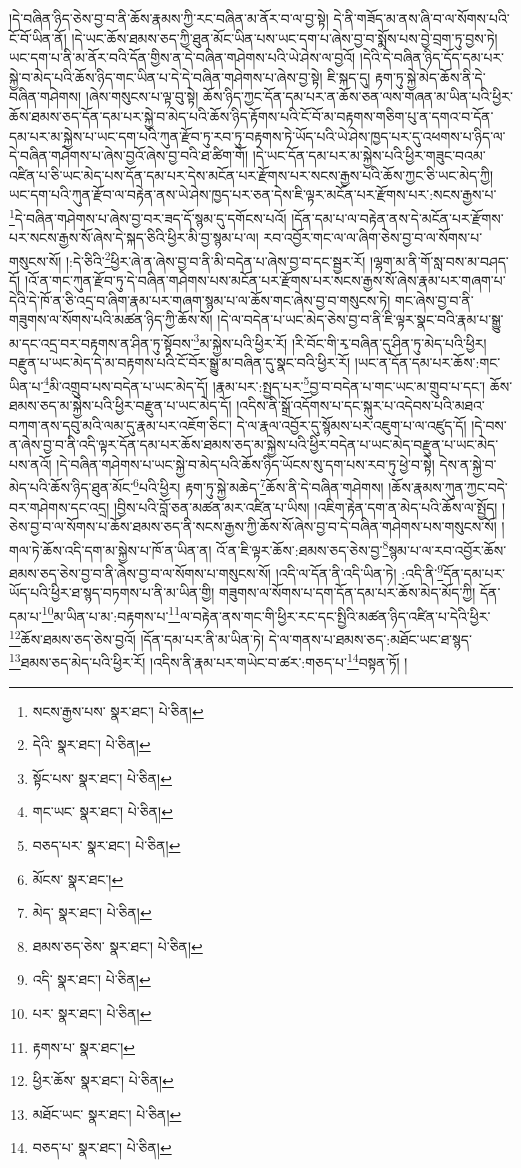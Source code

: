 །དེ་བཞིན་ཉིད་ཅེས་བྱ་བ་ནི་ཆོས་རྣམས་ཀྱི་རང་བཞིན་མ་ནོར་བ་ལ་བྱ་སྟེ། དེ་ནི་གཟོད་མ་ནས་ཞི་བ་ལ་སོགས་པའི་ངོ་བོ་ཡིན་ནོ། །དེ་ཡང་ཆོས་ཐམས་ཅད་ཀྱི་ཐུན་མོང་ཡིན་པས་ཡང་དག་པ་ཞེས་བྱ་བ་སྨོས་པས་བྱེ་བྲག་ཏུ་བྱས་ཏེ། ཡང་དག་པ་ནི་མ་ནོར་བའི་དོན་གྱིས་ན་དེ་བཞིན་གཤེགས་པའི་ཡེ་ཤེས་ལ་བྱའོ། །དེའི་དེ་བཞིན་ཉིད་དོད་དམ་པར་སྐྱེ་བ་མེད་པའི་ཆོས་ཉིད་གང་ཡིན་པ་དེ་དེ་བཞིན་གཤེགས་པ་ཞེས་བྱ་སྟེ། ཇི་སྐད་དུ། རྟག་ཏུ་སྐྱེ་མེད་ཆོས་ནི་དེ་བཞིན་གཤེགས། །ཞེས་གསུངས་པ་ལྟ་བུ་སྟེ། ཆོས་ཉིད་ཀྱང་དོན་དམ་པར་ན་ཆོས་ཅན་ལས་གཞན་མ་ཡིན་པའི་ཕྱིར་ཆོས་ཐམས་ཅད་དོན་དམ་པར་སྐྱེ་བ་མེད་པའི་ཆོས་ཉིད་རྟོགས་པའི་ངོ་བོ་མ་བརྟགས་གཅིག་པུ་ན་དགའ་བ་དོན་དམ་པར་མ་སྐྱེས་པ་ཡང་དག་པའི་ཀུན་རྫོབ་ཏུ་རབ་ཏུ་བརྟགས་ཏེ་ཡོད་པའི་ཡེ་ཤེས་ཁྱད་པར་དུ་འཕགས་པ་ཉིད་ལ་དེ་བཞིན་གཤེགས་པ་ཞེས་བྱའོ་ཞེས་བྱ་བའི་ཐ་ཚིག་གོ། །དེ་ཡང་དོན་དམ་པར་མ་སྐྱེས་པའི་ཕྱིར་གཟུང་བའམ་འཛིན་པ་ཅི་ཡང་མེད་པས་དོན་དམ་པར་དེས་མངོན་པར་རྫོགས་པར་སངས་རྒྱས་པའི་ཆོས་ཀྱང་ཅི་ཡང་མེད་ཀྱི། ཡང་དག་པའི་ཀུན་རྫོབ་ལ་བརྟེན་ནས་ཡེ་ཤེས་ཁྱད་པར་ཅན་དེས་ཇི་ལྟར་མངོན་པར་རྫོགས་པར་:སངས་རྒྱས་པ་\footnote{སངས་རྒྱས་པས་  སྣར་ཐང་།  པེ་ཅིན། }དེ་བཞིན་གཤེགས་པ་ཞེས་བྱ་བར་ཟད་དོ་སྙམ་དུ་དགོངས་པའོ། །དོན་དམ་པ་ལ་བརྟེན་ནས་དེ་མངོན་པར་རྫོགས་པར་སངས་རྒྱས་སོ་ཞེས་དེ་སྐད་ཅིའི་ཕྱིར་མི་བྱ་སྙམ་པ་ལ། རབ་འབྱོར་གང་ལ་ལ་ཞིག་ཅེས་བྱ་བ་ལ་སོགས་པ་གསུངས་སོ། །:དེ་ཅིའི་\footnote{དེའི་  སྣར་ཐང་།  པེ་ཅིན། }ཕྱིར་ཞེ་ན་ཞེས་བྱ་བ་ནི་མི་བདེན་པ་ཞེས་བྱ་བ་དང་སྦྱར་རོ། །ལྷག་མ་ནི་གོ་སླ་བས་མ་བཤད་དོ། །འོ་ན་གང་ཀུན་རྫོབ་ཏུ་དེ་བཞིན་གཤེགས་པས་མངོན་པར་རྫོགས་པར་སངས་རྒྱས་སོ་ཞེས་རྣམ་པར་གཞག་པ་དེའི་དེ་ཁོ་ན་ཅི་འདྲ་བ་ཞིག་རྣམ་པར་གཞག་སྙམ་པ་ལ་ཆོས་གང་ཞེས་བྱ་བ་གསུངས་ཏེ། གང་ཞེས་བྱ་བ་ནི་གཟུགས་ལ་སོགས་པའི་མཚན་ཉིད་ཀྱི་ཆོས་སོ། །དེ་ལ་བདེན་པ་ཡང་མེད་ཅེས་བྱ་བ་ནི་ཇི་ལྟར་སྣང་བའི་རྣམ་པ་སྒྱུ་མ་དང་འདྲ་བར་བརྟགས་ན་ཤིན་ཏུ་སྟོབས་\footnote{སྟོང་པས་  སྣར་ཐང་།  པེ་ཅིན། }མ་སྐྱེས་པའི་ཕྱིར་རོ། །རི་བོང་གི་རྭ་བཞིན་དུ་ཤིན་ཏུ་མེད་པའི་ཕྱིར། བརྫུན་པ་ཡང་མེད་དེ་མ་བརྟགས་པའི་ངོ་བོར་སྒྱུ་མ་བཞིན་དུ་སྣང་བའི་ཕྱིར་རོ། །ཡང་ན་དོན་དམ་པར་ཆོས་:གང་ཡིན་པ་\footnote{གང་ཡང་  སྣར་ཐང་།  པེ་ཅིན། }མི་འགྲུབ་པས་བདེན་པ་ཡང་མེད་དོ། །རྣམ་པར་:སྤྱད་པར་\footnote{བཅད་པར་  སྣར་ཐང་།  པེ་ཅིན། }བྱ་བ་བདེན་པ་གང་ཡང་མ་གྲུབ་པ་དང་། ཆོས་ཐམས་ཅད་མ་སྐྱེས་པའི་ཕྱིར་བརྫུན་པ་ཡང་མེད་དོ། །འདིས་ནི་སྒྲོ་འདོགས་པ་དང་སྐུར་པ་འདེབས་པའི་མཐའ་བཀག་ནས་དབུ་མའི་ལམ་དུ་རྣམ་པར་འཇོག་ཅིང་། དེ་ལ་རྣལ་འབྱོར་དུ་སྙོམས་པར་འཇུག་པ་ལ་འཛུད་དོ། །དེ་བས་ན་ཞེས་བྱ་བ་ནི་འདི་ལྟར་དོན་དམ་པར་ཆོས་ཐམས་ཅད་མ་སྐྱེས་པའི་ཕྱིར་བདེན་པ་ཡང་མེད་བརྫུན་པ་ཡང་མེད་པས་ནའོ། །དེ་བཞིན་གཤེགས་པ་ཡང་སྐྱེ་བ་མེད་པའི་ཆོས་ཉིད་ཡོངས་སུ་དག་པས་རབ་ཏུ་ཕྱེ་བ་སྟེ། དེས་ན་སྐྱེ་བ་མེད་པའི་ཆོས་ཉིད་ཐུན་མོང་\footnote{མོངས་  སྣར་ཐང་། }པའི་ཕྱིར། རྟག་ཏུ་སྐྱེ་མཆེད་\footnote{མེད་  སྣར་ཐང་།  པེ་ཅིན། }ཆོས་ནི་དེ་བཞིན་གཤེགས། །ཆོས་རྣམས་ཀུན་ཀྱང་བདེ་བར་གཤེགས་དང་འདྲ། །བྱིས་པའི་བློ་ཅན་མཚན་མར་འཛིན་པ་ཡིས། །འཇིག་རྟེན་དག་ན་མེད་པའི་ཆོས་ལ་སྤྱོད། །ཅེས་བྱ་བ་ལ་སོགས་པ་ཆོས་ཐམས་ཅད་ནི་སངས་རྒྱས་ཀྱི་ཆོས་སོ་ཞེས་བྱ་བ་དེ་བཞིན་གཤེགས་པས་གསུངས་སོ། །གལ་ཏེ་ཆོས་འདི་དག་མ་སྐྱེས་པ་ཁོ་ན་ཡིན་ན། འོ་ན་ཇི་ལྟར་ཆོས་:ཐམས་ཅད་ཅེས་བྱ་\footnote{ཐམས་ཅད་ཅེས་  སྣར་ཐང་།  པེ་ཅིན། }སྙམ་པ་ལ་རབ་འབྱོར་ཆོས་ཐམས་ཅད་ཅེས་བྱ་བ་ནི་ཞེས་བྱ་བ་ལ་སོགས་པ་གསུངས་སོ། །འདི་ལ་དོན་ནི་འདི་ཡིན་ཏེ། :འདི་ནི་\footnote{འདི་  སྣར་ཐང་།  པེ་ཅིན། }དོན་དམ་པར་ཡོད་པའི་ཕྱིར་ཐ་སྙད་བཏགས་པ་ནི་མ་ཡིན་གྱི། གཟུགས་ལ་སོགས་པ་དག་དོན་དམ་པར་ཆོས་མེད་མོད་ཀྱི། དོན་དམ་པ་\footnote{པར་  སྣར་ཐང་།  པེ་ཅིན། }མ་ཡིན་པ་མ་:བརྟགས་པ་\footnote{རྟགས་པ་  སྣར་ཐང་། }ལ་བརྟེན་ནས་གང་གི་ཕྱིར་རང་དང་སྤྱིའི་མཚན་ཉིད་འཛིན་པ་དེའི་ཕྱིར་\footnote{ཕྱིར་ཆོས་  སྣར་ཐང་།  པེ་ཅིན། }ཆོས་ཐམས་ཅད་ཅེས་བྱའོ། །དོན་དམ་པར་ནི་མ་ཡིན་ཏེ། དེ་ལ་གནས་པ་ཐམས་ཅད་:མཐོང་ཡང་ཐ་སྙད་\footnote{མཐོང་ཡང་  སྣར་ཐང་།  པེ་ཅིན། }ཐམས་ཅད་མེད་པའི་ཕྱིར་རོ། །འདིས་ནི་རྣམ་པར་གཡེང་བ་ཚར་:གཅད་པ་\footnote{བཅད་པ་  སྣར་ཐང་།  པེ་ཅིན། }བསྟན་ཏོ། །
